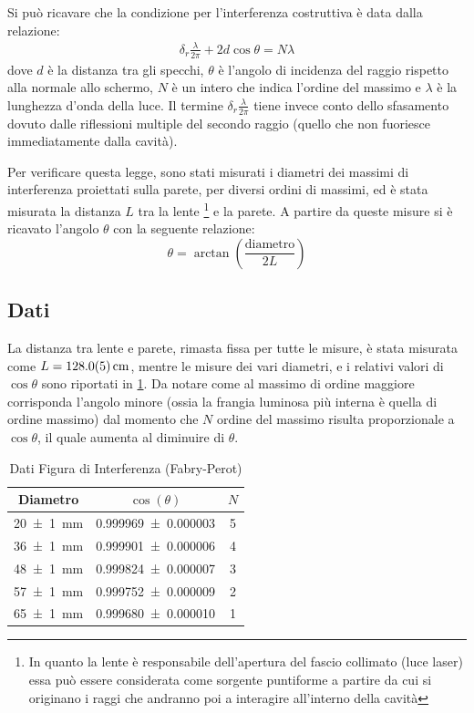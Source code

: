 \documentclass[a4paper]{article}
\begin{document}
Si può ricavare che la condizione per l'interferenza costruttiva è data dalla relazione:
\begin{align}
   \delta_r\frac{\lambda}{2\pi}+ 2d \cos \theta = N\lambda
\label{eq:max-interferenza-fabry-perot}
\end{align}
dove $d$ è la distanza tra gli specchi, $\theta$ è l'angolo di incidenza del raggio rispetto alla normale allo schermo, $N$ è un intero che indica l'ordine del massimo e $\lambda$ è la lunghezza d'onda della luce.
Il termine $\delta_r\frac{\lambda}{2\pi}$ tiene invece conto dello sfasamento dovuto dalle riflessioni multiple del secondo raggio (quello che non fuoriesce immediatamente dalla cavità).

Per verificare questa legge, sono stati misurati i diametri dei massimi di interferenza proiettati sulla parete, per diversi ordini di massimi, ed è stata misurata la distanza $L$ tra la lente \footnote{In quanto la lente è responsabile dell'apertura del fascio collimato (luce laser) essa può essere considerata come sorgente puntiforme a partire da cui si originano i raggi che andranno poi a interagire all'interno della cavità} e la parete. A partire da queste misure si è ricavato l'angolo $\theta$ con la seguente relazione:
\[\theta = \arctan \left(\frac{\text{diametro}}{2L}\right)\]

\subsection{Dati}
La distanza tra lente e parete, rimasta fissa per tutte le misure, è stata misurata come $L=\SI{128 \pm 0.5}{\centi\meter}$, mentre le misure dei vari diametri, e i relativi valori di $\cos{\theta}$ sono riportati in \cref{tab:fabry-perot-dati}. Da notare come al massimo di ordine maggiore corrisponda l'angolo minore (ossia la frangia luminosa più interna è quella di ordine massimo) dal momento che $N$ ordine del massimo risulta proporzionale a $\cos{\theta}$, il quale aumenta al diminuire di $\theta$.

\begin{table}[htbp]
\caption{Dati Figura di Interferenza (Fabry-Perot)}
\label{tab:fabry-perot-dati}
\centering
\begin{tabular}{|c|c|c|}
\hline
Diametro & $\cos(\theta)$ & $N$ \\\hline\hline
\SI{20 \pm 1}{\milli\meter} & \num{0.999969 \pm 0.000003}  & 5 \\
\SI{36 \pm 1}{\milli\meter} & \num{0.999901 \pm 0.000006}  & 4 \\
\SI{48 \pm 1}{\milli\meter} & \num{0.999824 \pm 0.000007}  & 3 \\
\SI{57 \pm 1}{\milli\meter} & \num{0.999752 \pm 0.000009}  & 2 \\
\SI{65 \pm 1}{\milli\meter} & \num{0.999680 \pm 0.000010}  & 1 \\
\hline
\end{tabular}
\end{table}
\end{document}
